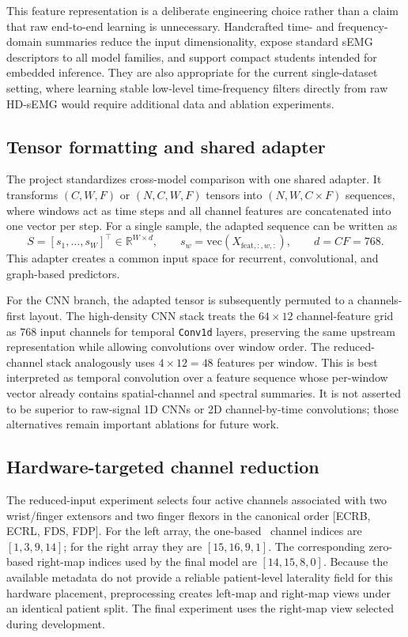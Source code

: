 This feature representation is a deliberate engineering choice rather than a claim that raw end-to-end learning is unnecessary. Handcrafted time- and frequency-domain summaries reduce the input dimensionality, expose standard sEMG descriptors to all model families, and support compact students intended for embedded inference. They are also appropriate for the current single-dataset setting, where learning stable low-level time-frequency filters directly from raw HD-sEMG would require additional data and ablation experiments.

\subsection{Tensor formatting and shared adapter}

The project standardizes cross-model comparison with one shared adapter. It transforms $(C, W, F)$ or $(N, C, W, F)$ tensors into $(N, W, C \times F)$ sequences, where windows act as time steps and all channel features are concatenated into one vector per step. For a single sample, the adapted sequence can be written as
\[
S = \left[s_1, \ldots, s_W\right]^\top \in \mathbb{R}^{W \times d},
\qquad
s_w = \mathrm{vec}\!\left(X_{\mathrm{feat},:,w,:}\right),
\qquad
d = C F = 768.
\]
This adapter creates a common input space for recurrent, convolutional, and graph-based predictors.

For the CNN branch, the adapted tensor is subsequently permuted to a channels-first layout. The high-density CNN stack treats the $64 \times 12$ channel-feature grid as 768 input channels for temporal \texttt{Conv1d} layers, preserving the same upstream representation while allowing convolutions over window order. The reduced-channel stack analogously uses $4 \times 12=48$ features per window. This is best interpreted as temporal convolution over a feature sequence whose per-window vector already contains spatial-channel and spectral summaries. It is not asserted to be superior to raw-signal 1D CNNs or 2D channel-by-time convolutions; those alternatives remain important ablations for future work.

\subsection{Hardware-targeted channel reduction}

The reduced-input experiment selects four active channels associated with two wrist/finger extensors and two finger flexors in the canonical order [ECRB, ECRL, FDS, FDP]. For the left array, the one-based \physiomio\ channel indices are $[1,3,9,14]$; for the right array they are $[15,16,9,1]$. The corresponding zero-based right-map indices used by the final model are $[14,15,8,0]$. Because the available metadata do not provide a reliable patient-level laterality field for this hardware placement, preprocessing creates left-map and right-map views under an identical patient split. The final experiment uses the right-map view selected during development.

